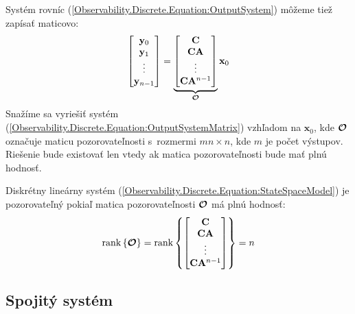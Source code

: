 \documentclass[a4paper, 10pt, ]{article}
\begin{document}
Systém rovníc (\ref{Observability.Discrete.Equation:OutputSystem}) môžeme tiež zapísať maticovo:
\begin{equation}
    \label{Observability.Discrete.Equation:OutputSystemMatrix}
    \begin{bmatrix}
        \mathbf{y}_{0}     \\
        \mathbf{y}_{1}     \\
        \vdots         \\
        \mathbf{y}_{n - 1} \\
    \end{bmatrix} = 
    \underbrace{
        \begin{bmatrix}
            \mathbf{C}                \\
            \mathbf{C} \mathbf{A}         \\
            \vdots                \\
            \mathbf{C} \mathbf{A}^{n - 1} \\
        \end{bmatrix}
    }_{\boldsymbol{\mathcal{O}}}
    \mathbf{x}_0
\end{equation}
Snažíme sa vyriešiť systém (\ref{Observability.Discrete.Equation:OutputSystemMatrix}) vzhľadom na $\bm{x}_{0}$, kde $\boldsymbol{\mathcal{O}}$ označuje maticu pozorovateľnosti s~rozmermi $mn \times n$, kde $m$ je počet výstupov. Riešenie bude existovať len vtedy ak matica pozorovateľnosti bude mať plnú hodnosť.

\begin{theorem}
    Diskrétny lineárny systém (\ref{Observability.Discrete.Equation:StateSpaceModel}) je pozorovateľný pokiaľ matica pozorovateľnosti $\boldsymbol{\mathcal{O}}$ má plnú hodnosť:
    \begin{equation}
        \label{Observability.Discrete.Equation:ObservabilityTheorem}
        \mathrm{rank} \left\{ \boldsymbol{\mathcal{O}} \right\} = 
        \mathrm{rank} \left\{
            \begin{bmatrix}
                \mathbf{C}                \\
                \mathbf{C} \mathbf{A}         \\
                \vdots                \\
                \mathbf{C} \mathbf{A}^{n - 1} \\
            \end{bmatrix}
        \right\} = 
        n
    \end{equation}
\end{theorem}


\subsection{Spojitý systém}
\end{document}
